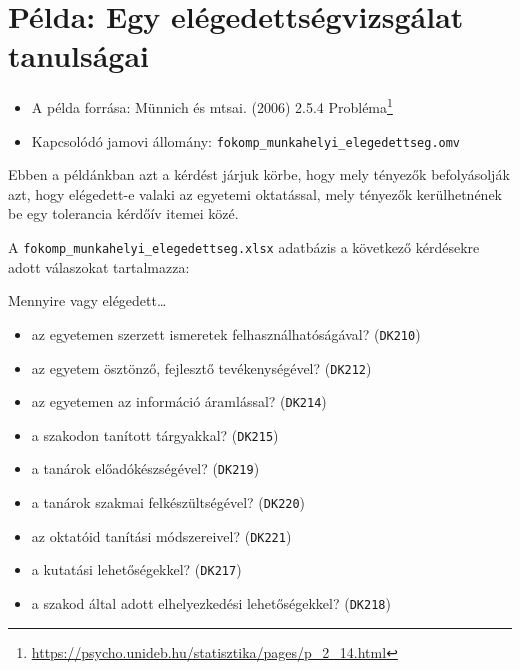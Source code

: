 \documentclass[
  letterpaper,
]{krantz}
\providecommand{\tightlist}{%
  \setlength{\itemsep}{0pt}\setlength{\parskip}{0pt}}\usepackage{longtable,booktabs,array}
\renewcommand{\href}[2]{#2\footnote{\url{#1}}}
\begin{document}
\hypertarget{puxe9lda-egy-eluxe9gedettsuxe9gvizsguxe1lat-tanulsuxe1gai}{%
\section{Példa: Egy elégedettségvizsgálat
tanulságai}\label{puxe9lda-egy-eluxe9gedettsuxe9gvizsguxe1lat-tanulsuxe1gai}}

\begin{itemize}
\tightlist
\item
  A példa forrása: Münnich és mtsai. (2006)
  \href{https://psycho.unideb.hu/statisztika/pages/p_2_14.html}{2.5.4
  Probléma}
\item
  Kapcsolódó jamovi állomány:
  \texttt{fokomp\_munkahelyi\_elegedettseg.omv}
\end{itemize}

Ebben a példánkban azt a kérdést járjuk körbe, hogy mely tényezők
befolyásolják azt, hogy elégedett-e valaki az egyetemi oktatással, mely
tényezők kerülhetnének be egy tolerancia kérdőív itemei közé.

A \texttt{fokomp\_munkahelyi\_elegedettseg.xlsx} adatbázis a következő
kérdésekre adott válaszokat tartalmazza:

Mennyire vagy elégedett\ldots{}

\begin{itemize}
\tightlist
\item
  az egyetemen szerzett ismeretek felhasználhatóságával?
  (\texttt{DK210})
\item
  az egyetem ösztönző, fejlesztő tevékenységével? (\texttt{DK212})
\item
  az egyetemen az információ áramlással? (\texttt{DK214})
\item
  a szakodon tanított tárgyakkal? (\texttt{DK215})
\item
  a tanárok előadókészségével? (\texttt{DK219})
\item
  a tanárok szakmai felkészültségével? (\texttt{DK220})
\item
  az oktatóid tanítási módszereivel? (\texttt{DK221})
\item
  a kutatási lehetőségekkel? (\texttt{DK217})\\
\item
  a szakod által adott elhelyezkedési lehetőségekkel? (\texttt{DK218})
\end{itemize}
\end{document}
